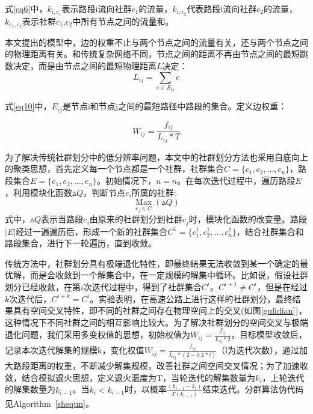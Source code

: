 				式\ref{eq6}中，${k_{i,{c_1}}}$表示路段i流向社群$c_1$的流量，$k_{i,{c_2}}$代表路段i流向社群$c_2$的流量，${{{k_{{c_1},{c_2}}}}}$表示社群$c_1$,$c_2$中所有节点之间的流量和。

				本文提出的模型中，边的权重不止与两个节点之间的流量有关，还与两个节点之间的物理距离有关。和传统复杂网络不同，节点之间的距离不再由节点之间的最短跳数决定，而是由节点之间的最短物理距离$L$决定：
				\begin{equation}
				L_{ij}=\sum\limits_{e \in E_{ij}} {e}
				\label{eq10}
				\end{equation}

				式\ref{eq10}中，$E_{ij}$是节点i和节点j之间的最短路径中路段的集合。定义边权重：


				\begin{equation}
				W_{ij}=\frac{f_{ij}}{L_{ij}*T}
				\label{eq11}
				\end{equation}

				为了解决传统社群划分中的低分辨率问题，本文中的社群划分方法也采用自底向上的聚类思想，首先定义每一个节点都是一个社群，社群集合$C=\{c_1,c_2,\dots,c_u\}$，路段集合$E=\{e_1,e_2,\dots,e_n\}$。初始情况下，$u=n$。在每次迭代过程中，遍历路段$E$，利用模块化函数$\vartriangle Q$，判断节点$e_i$所属的社群:
					$$\mathop{Max}\limits_{c_j\in C} (\vartriangle Q)$$
				式中，$\vartriangle Q$表示当路段$e_i$由原来的社群划分到社群$c_j$时，模块化函数的改变量。路段$|E|$经过一遍遍历后，形成一个新的社群集合$C^1=\{c_1^1,c_2^1,\dots,c_u^1\}$，结合社群集合和路段集合，进行下一轮遍历，直到收敛。

				传统方法中，社群划分具有极端退化特性，即最终结果无法收敛到某一个确定的最优解，而是会收敛到一个解集合中，在一定规模的解集中循环。比如说，假设社群划分已经收敛，在第$i$次迭代过程中，得到了社群集合$C^i$。$C^{i+1}\ne C^{i}$，但是在经过$k$次迭代后，$C^{i+k}=C^{i}$。实验表明，在高速公路上进行这样的社群划分，最终结果具有空间交叉特性，即不同的社群之间存在物理空间上的交叉(如图\ref{gulidian})，这种情况下不同社群之间的相互影响比较大。为了解决社群划分的空间交叉与极端退化问题，我们采用多变权值的思想，初始权值为$W_{ij}=\frac{f_{ij}}{L_{ij}*2}$，目标模型收敛后，记录本次迭代解集的规模k，变化权值$W_{ij}=\frac{f_{ij}}{L_{ij}*(2-0.1*l)}$（l为迭代次数），通过加大路段距离的权重，不断减少解集规模，改善社群之间空间交叉情况；为了加速收敛，结合模拟退火思想，定义退火温度为T，当轮迭代的解集数量为$k_i$，上轮迭代的解集数量为$k_{i-1}$。当$k_i<k_{i-1}$时，以概率$\frac {(k_{i-1}-k_i)}{T(k_{i-1})}$结束迭代。分群算法伪代码见Algorithm\ \ref{shequn}。

